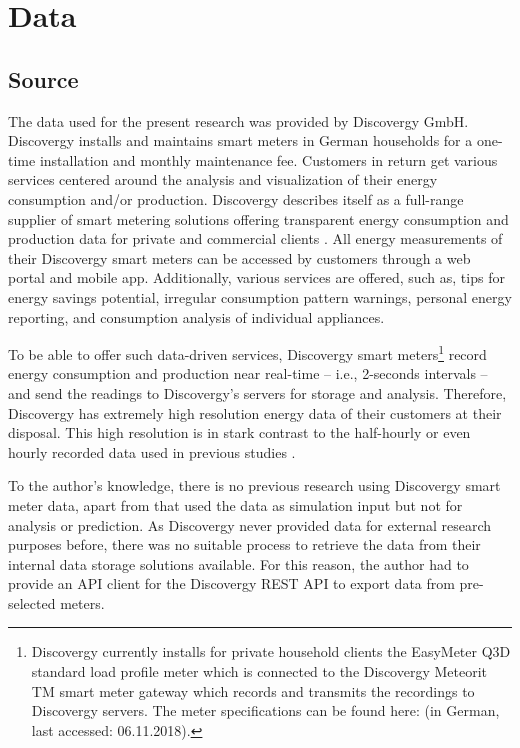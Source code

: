 
\section{Data}\label{Sec:Data}




\subsection{Source}\label{Sec:Data;Subsec:Source}

The data used for the present research was provided by Discovergy GmbH. Discovergy installs and maintains smart meters in German households for a one-time installation and monthly maintenance fee. Customers in return get various services centered around the analysis and visualization of their energy consumption and/or production. Discovergy describes itself as a full-range supplier of smart metering solutions offering transparent energy consumption and production data for private and commercial clients \citep{Discovergy:2018}. All energy measurements of their Discovergy smart meters can be accessed by customers through a web portal and mobile app. Additionally, various services are offered, such as, tips for energy savings potential, irregular consumption pattern warnings, personal energy reporting, and consumption analysis of individual appliances.

To be able to offer such data-driven services, Discovergy smart meters\footnote{Discovergy currently installs for private household clients the EasyMeter Q3D standard load profile meter which is connected to the Discovergy Meteorit TM smart meter gateway which records and transmits the recordings to Discovergy servers. The meter specifications can be found here:  (in German, last accessed: 06.11.2018).} record energy consumption and production near real-time -- i.e., 2-seconds intervals -- and send the readings to Discovergy's servers for storage and analysis. Therefore, Discovergy has extremely high resolution energy data of their customers at their disposal. This high resolution is in stark contrast to the half-hourly or even hourly recorded data used in previous studies \citep[e.g.,][]{Arora:2016,Auder:2018,Shi:2017,Gerossier:2017}.

To the author's knowledge, there is no previous research using Discovergy smart meter data, apart from \citet{Teixeira:2017} that used the data as simulation input but not for analysis or prediction. As Discovergy never provided data for external research purposes before, there was no suitable process to retrieve the data from their internal data storage solutions available. For this reason, the author had to provide an API client for the Discovergy REST API to export data from pre-selected meters.



